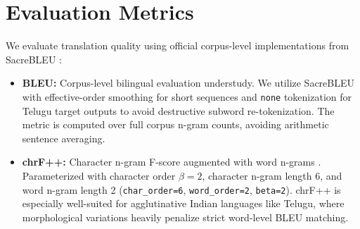 \documentclass[conference]{IEEEtran}
\begin{document}
\begin{table}[t]
\caption{Model and Training Configurations}
\label{tab:hyperparams}
\centering
{}
\end{table}

\section{Evaluation Metrics}
\label{sec:metrics}

We evaluate translation quality using official corpus-level implementations from SacreBLEU \cite{post-2018-call}:
\begin{itemize}
    \item \textbf{BLEU:} Corpus-level bilingual evaluation understudy. We utilize SacreBLEU with effective-order smoothing for short sequences and \texttt{none} tokenization for Telugu target outputs to avoid destructive subword re-tokenization. The metric is computed over full corpus n-gram counts, avoiding arithmetic sentence averaging.
    \item \textbf{chrF++:} Character n-gram F-score augmented with word n-grams \cite{popovic-2017-chrf}. Parameterized with character order $\beta=2$, character n-gram length 6, and word n-gram length 2 (\texttt{char\_order=6}, \texttt{word\_order=2}, \texttt{beta=2}). chrF++ is especially well-suited for agglutinative Indian languages like Telugu, where morphological variations heavily penalize strict word-level BLEU matching.
\end{itemize}
\end{document}
